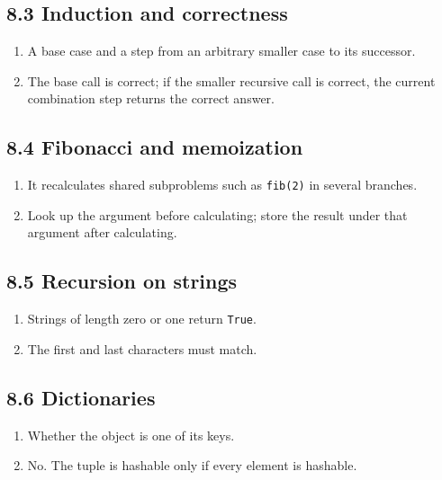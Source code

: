 \documentclass[11pt]{article}
\begin{document}
\begin{keepsection}\subsection{8.3 Induction and correctness}

\begin{enumerate}
\item A base case and a step from an arbitrary smaller case to its successor.
\item The base call is correct; if the smaller recursive call is correct, the current combination step returns the correct answer.
\end{enumerate}

\end{keepsection}
\begin{keepsection}\subsection{8.4 Fibonacci and memoization}

\begin{enumerate}
\item It recalculates shared subproblems such as \texttt{fib(2)} in several branches.
\item Look up the argument before calculating; store the result under that argument after calculating.
\end{enumerate}

\end{keepsection}
\begin{keepsection}\subsection{8.5 Recursion on strings}

\begin{enumerate}
\item Strings of length zero or one return \texttt{True}.
\item The first and last characters must match.
\end{enumerate}

\end{keepsection}
\begin{keepsection}\subsection{8.6 Dictionaries}

\begin{enumerate}
\item Whether the object is one of its keys.
\item No. The tuple is hashable only if every element is hashable.
\end{enumerate}

\end{keepsection}
\end{document}
